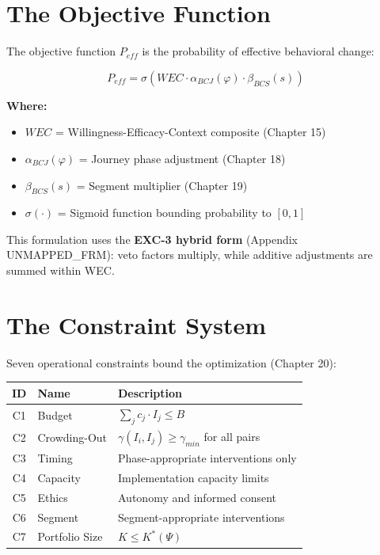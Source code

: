 \section{The Objective Function}
\label{sec:25-objective}

The objective function $P_{eff}$ is the probability of effective behavioral change:

\begin{equation}
P_{eff} = \sigma\left( WEC \cdot \alpha_{BCJ}(\varphi) \cdot \beta_{BCS}(s) \right)
\label{eq:peff}
\end{equation}

\textbf{Where:}
\begin{itemize}
    \item $WEC$ = Willingness-Efficacy-Context composite (Chapter 15)
    \item $\alpha_{BCJ}(\varphi)$ = Journey phase adjustment (Chapter 18)
    \item $\beta_{BCS}(s)$ = Segment multiplier (Chapter 19)
    \item $\sigma(\cdot)$ = Sigmoid function bounding probability to $[0,1]$
\end{itemize}

This formulation uses the \textbf{EXC-3 hybrid form} (Appendix UNMAPPED_FRM): veto factors multiply, while additive adjustments are summed within WEC.


\section{The Constraint System}
\label{sec:25-constraints}

Seven operational constraints bound the optimization (Chapter 20):

\begin{tcolorbox}[colback=orange!5!white,colframe=orange!75!black,
    title=\textbf{Operational Constraints C1--C7}]
\begin{tabular}{|c|l|p{7cm}|}
\hline
\textbf{ID} & \textbf{Name} & \textbf{Description} \\
\hline
C1 & Budget & $\sum_j c_j \cdot I_j \leq B$ \\
C2 & Crowding-Out & $\gamma(I_i, I_j) \geq \gamma_{min}$ for all pairs \\
C3 & Timing & Phase-appropriate interventions only \\
C4 & Capacity & Implementation capacity limits \\
C5 & Ethics & Autonomy and informed consent \\
C6 & Segment & Segment-appropriate interventions \\
C7 & Portfolio Size & $K \leq K^*(\Psi)$ \\
\hline
\end{tabular}
\end{tcolorbox}

